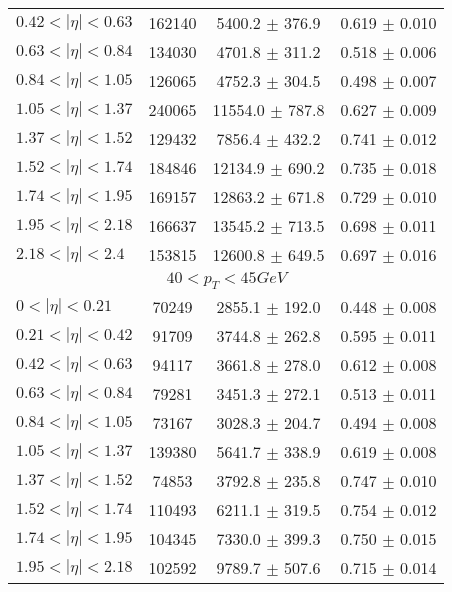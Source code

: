 \begin{tabular}{lccc}
$0.42 < |\eta| <0.63$          & 162140     & 5400.2     $\pm$ 376.9 & 0.619      $\pm$ 0.010 \\
$0.63 < |\eta| <0.84$          & 134030     & 4701.8     $\pm$ 311.2 & 0.518      $\pm$ 0.006 \\
$0.84 < |\eta| <1.05$          & 126065     & 4752.3     $\pm$ 304.5 & 0.498      $\pm$ 0.007 \\
$1.05 < |\eta| <1.37$          & 240065     & 11554.0    $\pm$ 787.8 & 0.627      $\pm$ 0.009 \\
$1.37 < |\eta| <1.52$          & 129432     & 7856.4     $\pm$ 432.2 & 0.741      $\pm$ 0.012 \\
$1.52 < |\eta| <1.74$          & 184846     & 12134.9    $\pm$ 690.2 & 0.735      $\pm$ 0.018 \\
$1.74 < |\eta| <1.95$          & 169157     & 12863.2    $\pm$ 671.8 & 0.729      $\pm$ 0.010 \\
$1.95 < |\eta| <2.18$          & 166637     & 13545.2    $\pm$ 713.5 & 0.698      $\pm$ 0.011 \\
$2.18 < |\eta| <2.4$           & 153815     & 12600.8    $\pm$ 649.5 & 0.697      $\pm$ 0.016 \\
\hline
\multicolumn{4}{c}{$40 < p_{T} < 45 GeV$} \\
\hline
$0 < |\eta| <0.21$             & 70249      & 2855.1     $\pm$ 192.0 & 0.448      $\pm$ 0.008 \\
$0.21 < |\eta| <0.42$          & 91709      & 3744.8     $\pm$ 262.8 & 0.595      $\pm$ 0.011 \\
$0.42 < |\eta| <0.63$          & 94117      & 3661.8     $\pm$ 278.0 & 0.612      $\pm$ 0.008 \\
$0.63 < |\eta| <0.84$          & 79281      & 3451.3     $\pm$ 272.1 & 0.513      $\pm$ 0.011 \\
$0.84 < |\eta| <1.05$          & 73167      & 3028.3     $\pm$ 204.7 & 0.494      $\pm$ 0.008 \\
$1.05 < |\eta| <1.37$          & 139380     & 5641.7     $\pm$ 338.9 & 0.619      $\pm$ 0.008 \\
$1.37 < |\eta| <1.52$          & 74853      & 3792.8     $\pm$ 235.8 & 0.747      $\pm$ 0.010 \\
$1.52 < |\eta| <1.74$          & 110493     & 6211.1     $\pm$ 319.5 & 0.754      $\pm$ 0.012 \\
$1.74 < |\eta| <1.95$          & 104345     & 7330.0     $\pm$ 399.3 & 0.750      $\pm$ 0.015 \\
$1.95 < |\eta| <2.18$          & 102592     & 9789.7     $\pm$ 507.6 & 0.715      $\pm$ 0.014 \\

\end{tabular}
